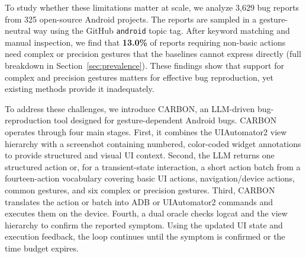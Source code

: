 \documentclass[10pt,conference,a4paper]{IEEEtran}
\begin{document}
   To study whether these limitations matter at scale, we analyze 3,629 bug reports from 325 open-source Android projects. The reports are sampled in a gesture-neutral way using the GitHub \texttt{android} topic tag. After keyword matching and manual inspection, we find that \textbf{13.0\%} of reports requiring non-basic actions need complex or precision gestures that the baselines cannot express directly (full breakdown in Section~\ref{sec:prevalence}). These findings show that support for complex and precision gestures matters for effective bug reproduction, yet existing methods provide it inadequately.


To address these challenges, we introduce CARBON, an LLM-driven bug-reproduction tool designed for gesture-dependent Android bugs. CARBON operates through four main stages. First, it combines the UIAutomator2 view hierarchy with a screenshot containing numbered, color-coded widget annotations to provide structured and visual UI context. Second, the LLM returns one structured action or, for a transient-state interaction, a short action batch from a fourteen-action vocabulary covering basic UI actions, navigation/device actions, common gestures, and six complex or precision gestures. Third, CARBON translates the action or batch into ADB or UIAutomator2 commands and executes them on the device. Fourth, a dual oracle checks logcat and the view hierarchy to confirm the reported symptom. Using the updated UI state and execution feedback, the loop continues until the symptom is confirmed or the time budget expires.
\end{document}
